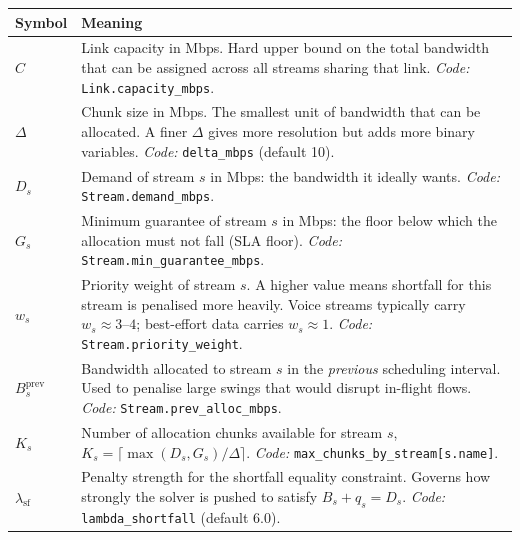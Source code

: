 \documentclass[11pt,a4paper]{article}
\begin{document}
\begin{tabular}{@{}lp{10.5cm}@{}}
\toprule
Symbol & Meaning \\
\midrule
$C$ & Link capacity in Mbps. Hard upper bound on the total bandwidth that can be
      assigned across all streams sharing that link.
      \textit{Code:} \texttt{Link.capacity\_mbps}. \\[4pt]

$\Delta$ & Chunk size in Mbps. The smallest unit of bandwidth that can be
           allocated. A finer $\Delta$ gives more resolution but adds more binary
           variables.
           \textit{Code:} \texttt{delta\_mbps} (default 10). \\[4pt]

$D_s$ & Demand of stream $s$ in Mbps: the bandwidth it ideally wants.
        \textit{Code:} \texttt{Stream.demand\_mbps}. \\[4pt]

$G_s$ & Minimum guarantee of stream $s$ in Mbps: the floor below which the
        allocation must not fall (SLA floor).
        \textit{Code:} \texttt{Stream.min\_guarantee\_mbps}. \\[4pt]

$w_s$ & Priority weight of stream $s$. A higher value means shortfall for this
        stream is penalised more heavily. Voice streams typically carry
        $w_s \approx 3$--$4$; best-effort data carries $w_s \approx 1$.
        \textit{Code:} \texttt{Stream.priority\_weight}. \\[4pt]

$B_s^{\text{prev}}$ & Bandwidth allocated to stream $s$ in the \emph{previous}
                      scheduling interval. Used to penalise large swings that
                      would disrupt in-flight flows.
                      \textit{Code:} \texttt{Stream.prev\_alloc\_mbps}. \\[4pt]

$K_s$ & Number of allocation chunks available for stream $s$,
        $K_s = \lceil \max(D_s, G_s) / \Delta \rceil$.
        \textit{Code:} \texttt{max\_chunks\_by\_stream[s.name]}. \\[4pt]

$\lambda_{\text{sf}}$ & Penalty strength for the shortfall equality constraint.
                        Governs how strongly the solver is pushed to satisfy
                        $B_s + q_s = D_s$.
                        \textit{Code:} \texttt{lambda\_shortfall} (default 6.0). \\[4pt]


\end{tabular}
\end{document}
